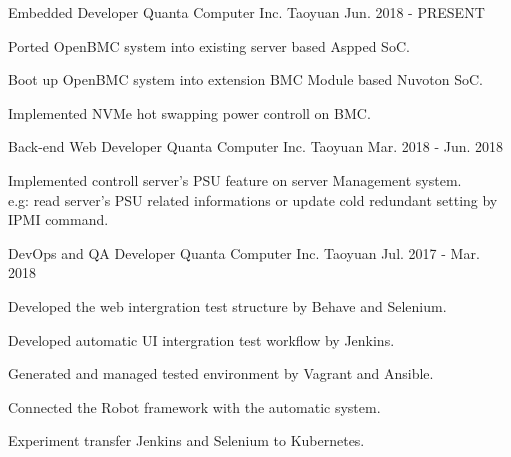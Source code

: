 
\begin{cventries}

  \cventry
    {Embedded Developer} %
    {Quanta Computer Inc.} %
    {Taoyuan} %
    {Jun. 2018 - PRESENT} %
    {
      \begin{cvitems} %
        \item {Ported OpenBMC system into existing server based Aspped SoC.}
        \item {Boot up OpenBMC system into extension BMC Module based Nuvoton SoC.}
        \item {Implemented NVMe hot swapping power controll on BMC.}
      \end{cvitems}
    }

  \cventry
    {Back-end Web Developer} %
    {Quanta Computer Inc.} %
    {Taoyuan} %
    {Mar. 2018 - Jun. 2018} %
    {
      \begin{cvitems} %
        \item {Implemented controll server's PSU feature on server Management system. \\
            e.g: read server's PSU related informations or update cold redundant setting by IPMI command.}
      \end{cvitems}
    }

  \cventry
  {DevOps and QA Developer} %
  {Quanta Computer Inc.} %
  {Taoyuan} %
  {Jul. 2017 - Mar. 2018} %
  {
    \begin{cvitems} %
      \item {Developed the web intergration test structure by Behave and Selenium.}
      \item {Developed automatic UI intergration test workflow by Jenkins.}
      \item {Generated and managed tested environment by Vagrant and Ansible.}
      \item {Connected the Robot framework with the automatic system.}
      \item {Experiment transfer Jenkins and Selenium to Kubernetes.}
    \end{cvitems}
  }


\end{cventries}
